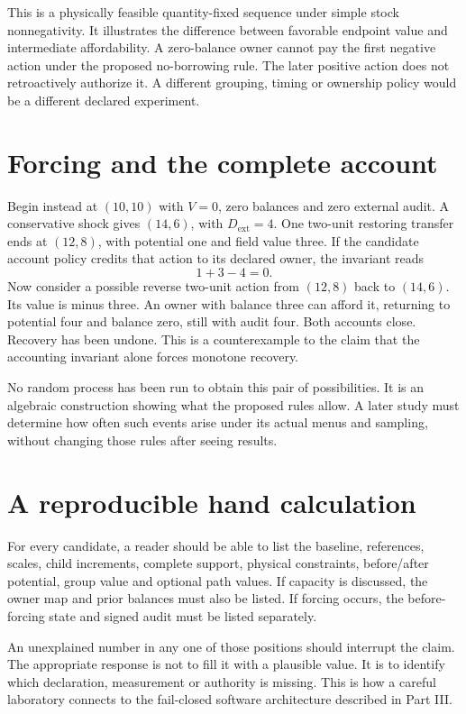 This is a physically feasible quantity-fixed sequence under simple stock
nonnegativity. It illustrates the difference between favorable endpoint
value and intermediate affordability. A zero-balance owner cannot pay the
first negative action under the proposed no-borrowing rule. The later
positive action does not retroactively authorize it. A different grouping,
timing or ownership policy would be a different declared experiment.

\section{Forcing and the complete account}
Begin instead at $(10,10)$ with $V=0$, zero balances and zero external
audit. A conservative shock gives $(14,6)$, with $D_{\mathrm{ext}}=4$.
One two-unit restoring transfer ends at $(12,8)$, with potential one and
field value three. If the candidate account policy credits that action
to its declared owner, the invariant reads
\begin{equation}
 1+3-4=0.
\end{equation}
Now consider a possible reverse two-unit action from $(12,8)$ back to
$(14,6)$. Its value is minus three. An owner with balance three can afford
it, returning to potential four and balance zero, still with audit four.
Both accounts close. Recovery has been undone. This is a counterexample
to the claim that the accounting invariant alone forces monotone recovery.

No random process has been run to obtain this pair of possibilities. It is
an algebraic construction showing what the proposed rules allow. A later
study must determine how often such events arise under its actual menus and
sampling, without changing those rules after seeing results.

\section{A reproducible hand calculation}
For every candidate, a reader should be able to list the baseline, references,
scales, child increments, complete support, physical constraints, before/after
potential, group value and optional path values. If capacity is discussed,
the owner map and prior balances must also be listed. If forcing occurs,
the before-forcing state and signed audit must be listed separately.

An unexplained number in any one of those positions should interrupt the
claim. The appropriate response is not to fill it with a plausible value.
It is to identify which declaration, measurement or authority is missing.
This is how a careful laboratory connects to the fail-closed software
architecture described in Part III.

